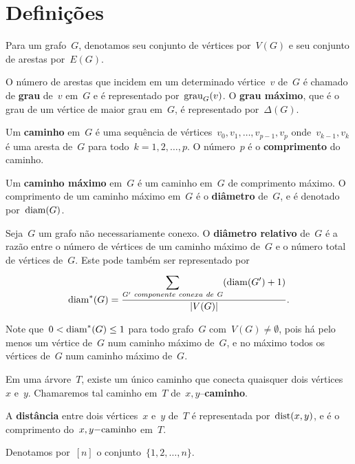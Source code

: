 \section{Definições}
	
	Para um grafo~$G$, denotamos seu
	conjunto de vértices por~$V(G)$ e seu
	conjunto de arestas por~$E(G)$.

\bigskip
	O número de arestas que incidem em um 
	determinado vértice~$v$ de~$G$ é chamado de 
	\textbf{grau} de~$v$ em~$G$ e é representado
	por~$\mathrm{grau}_G(v)$. O 
	\textbf{grau máximo}, que é o grau de um vértice de
	maior grau em~$G$, é representado por~$\Delta(G)$.

\bigskip

	Um \textbf{caminho} em~$G$ é uma sequência de 
	vértices~$v_0, v_1, \ldots,v_{p-1}, v_p$ 
	onde~$v_{k-1}, v_k$ é uma aresta de~$G$ para 
	todo~${k =1,2, \ldots, p}$. 
	O número~$p$ é o \textbf{comprimento} do caminho.

\bigskip

	Um \textbf{caminho máximo} em~$G$ é um caminho 
	em~$G$ de comprimento máximo.
	O comprimento de um caminho máximo em~$G$
	é o \textbf{diâmetro} de~$G$, e é denotado por~$\mathrm{diam}(G)$.



	Seja~$G$ um grafo não necessariamente conexo.
	O \textbf{diâmetro relativo} de~$G$
	 é a razão entre o número
	de vértices de um caminho máximo de~$G$ e o número total de vértices
	de~$G$. Este pode também ser representado por
	$$ \mathrm{diam}^*(G) =\dfrac{\displaystyle\sum_{
	G'~componente~conexa~de~G}^{}(\mathrm{diam}(G')+1)}{|V(G)|}.$$

	Note que~${0<\mathrm{diam}^*(G)\le 1}$ para todo grafo~$G$ 
	com~${V(G)\ne \emptyset}$, pois há pelo menos um vértice 
	de~$G$ num caminho máximo de~$G$, e no máximo 
	todos os vértices de~$G$ num caminho máximo de~$G$.

\bigskip

	Em uma árvore~$T$, existe um único caminho que conecta 
	quaisquer dois vértices~$x$ e~$y$. 
	Chamaremos tal caminho em~$T$ de~$x,y$--\textbf{caminho}.

\bigskip

	A \textbf{distância} entre dois vértices~$x$ e~$y$ de~$T$ é 
	representada por~$\mathrm{dist}(x,y)$, e é o comprimento 
	do~$x,y\mathrm{-caminho}$ em~$T$.

\bigskip

	Denotamos por~$[n]$
	o conjunto~$\{1,2,\ldots,n\}$.


\bigskip
\bigskip
\bigskip
